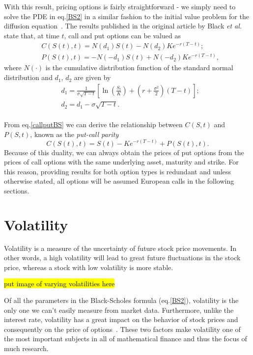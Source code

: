 With this result, pricing options is fairly straightforward - we simply need to solve the PDE in eq.\eqref{BS2} in a similar fashion to the initial value problem for the diffusion equation~\cite{Dilao}.
The results published in the original article by Black \textit{et al.} state that, at time $t$, call and put options can be valued as
\begin{equation}\label{callputBS}
\begin{split}
&C(S(t),t)=N(d_1)S(t)-N(d_2)Ke^{-r(T-t)};\\
&P(S(t),t)=-N(-d_1)S(t)+N(-d_2)Ke^{-r(T-t)},
\end{split}
\end{equation}
\noindent where $N(\cdot)$ is the cumulative distribution function of the standard normal distribution and $d_1$, $d_2$ are given by
\begin{equation}\label{d1d2}
\begin{split}
&d_1=\frac{1}{\sigma\sqrt{T-t}}\left[\ln\left(\frac{S_t}{K}\right)+\left(r+\frac{\sigma^2}{2}\right)(T - t)\right];\\
&d_2=d_1-\sigma\sqrt{T-t}.\\
\end{split}
\end{equation}



From eq.\eqref{callputBS} we can derive the relationship between $C(S,t)$ and $P(S,t)$, known as the \emph{put-call parity}
\begin{equation}
C(S(t),t)=S(t)-Ke^{-r(T-t)}+P(S(t),t).
\end{equation}
\noindent Because of this duality, we can always obtain the prices of put options from the prices of call options with the same underlying asset, maturity and strike. For this reason, providing results for both option types is redundant and unless otherwise stated, all options will be assumed European calls in the following sections.


\section{Volatility}
\label{section:volatility}
Volatility is a measure of the uncertainty of future stock price movements. In other words, a high volatility will lead to great future fluctuations in the stock price, whereas a stock with low volatility is more stable.

\hl{put image of varying volatilities here}

Of all the parameters in the Black-Scholes formula (eq.\eqref{BS2}), volatility is the only one we can't easily measure from market data.
Furthermore, unlike the interest rate, volatility has a great impact on the behavior of stock prices and consequently on the price of options~\cite{Wilmott3}.
These two factors make volatility one of the most important subjects in all of mathematical finance and thus the focus of much research.



